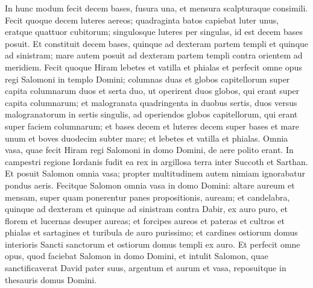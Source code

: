 \begin{biblechapter}
\begin{biblechapter}
\begin{biblechapter}
\begin{biblechapter}
\begin{biblechapter}
\begin{biblechapter}
\begin{biblechapter}
\verse In hunc modum fecit decem bases, fusura una, et mensura scalpturaque consimili. 
\verse Fecit quoque decem luteres aereos; quadraginta batos capiebat luter unus, eratque quattuor cubitorum; singulosque luteres per singulas, id est decem bases posuit. 
\verse Et constituit decem bases, quinque ad dexteram partem templi et quinque ad sinistram; mare autem posuit ad dexteram partem templi contra orientem ad meridiem.
 \verse Fecit quoque Hiram lebetes et vatilla et phialas et perfecit omne opus regi Salomoni in templo Domini; 
\verse columnas duas et globos capitellorum super capita columnarum duos et serta duo, ut operirent duos globos, qui erant super capita columnarum; 
\verse et malogranata quadringenta in duobus sertis, duos versus malogranatorum in sertis singulis, ad operiendos globos capitellorum, qui erant super faciem columnarum; 
\verse et bases decem et luteres decem super bases 
\verse et mare unum et boves duodecim subter mare; 
\verse et lebetes et vatilla et phialas. Omnia vasa, quae fecit Hiram regi Salomoni in domo Domini, de aere polito erant. 
\verse In campestri regione Iordanis fudit ea rex in argillosa terra inter Succoth et Sarthan. 
\verse Et posuit Salomon omnia vasa; propter multitudinem autem nimiam ignorabatur pondus aeris.
 \verse Fecitque Salomon omnia vasa in domo Domini: altare aureum et mensam, super quam ponerentur panes propositionis, auream; 
\verse et candelabra, quinque ad dexteram et quinque ad sinistram contra Dabir, ex auro puro, et florem et lucernas desuper aureas; et forcipes aureos 
\verse et pateras et cultros et phialas et sartagines et turibula de auro purissimo; et cardines ostiorum domus interioris Sancti sanctorum et ostiorum domus templi ex auro.
 \verse Et perfecit omne opus, quod faciebat Salomon in domo Domini, et intulit Salomon, quae sanctificaverat David pater suus, argentum et aurum et vasa, reposuitque in thesauris domus Domini.
 

\end{biblechapter}
\end{biblechapter}
\end{biblechapter}
\end{biblechapter}
\end{biblechapter}
\end{biblechapter}
\end{biblechapter}
